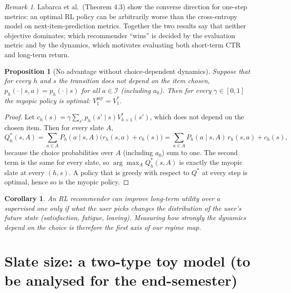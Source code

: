\documentclass[11pt]{article}
\newtheorem{proposition}{Proposition}
\newtheorem{corollary}{Corollary}
\theoremstyle{remark}
\newtheorem{remark}{Remark}
\newcommand{\I}{\mathcal{I}}
\begin{document}
\begin{remark}
Labarca et al.\ (Theorem 4.3) show the converse direction for one-step metrics: an optimal RL policy can be
arbitrarily worse than the cross-entropy model on next-item-prediction metrics. Together the two results say that
neither objective dominates; which recommender ``wins'' is decided by the evaluation metric and by the
dynamics, which motivates evaluating both short-term CTR and long-term return.
\end{remark}

\begin{proposition}[No advantage without choice-dependent dynamics]\label{prop:noadv}
Suppose that for every $h$ and $s$ the transition does not depend on the item chosen,
$p_h(\cdot \mid s, a) = p_h(\cdot \mid s)$ for all $a \in \I$ (including $a_0$). Then for every $\gamma \in [0,1]$
the myopic policy is optimal: $V^{\mathrm{my}}_1 = V^*_1$.
\end{proposition}
\begin{proof}
Let $c_h(s) = \gamma \sum_{s'} p_h(s' \mid s) V^*_{h+1}(s')$, which does not depend on the chosen item. Then for every
slate $A$,
\[
Q^*_h(s, A) = \sum_{a \in A} P_h(a \mid s, A) \bigl(r_h(s,a) + c_h(s)\bigr)
= \sum_{a \in A} P_h(a \mid s, A)\, r_h(s,a) + c_h(s),
\]
because the choice probabilities over $A$ (including $a_0$) sum to one. The second term is the same for every
slate, so $\arg\max_A Q^*_h(s, A)$ is exactly the myopic slate at every $(h, s)$. A policy that is greedy with
respect to $Q^*$ at every step is optimal, hence so is the myopic policy.
\end{proof}

\begin{corollary}
An RL recommender can improve long-term utility over a supervised one only if what the user picks changes the
distribution of the user's future state (satisfaction, fatigue, leaving). Measuring how strongly the
dynamics depend on the choice is therefore the first axis of our regime map.
\end{corollary}

\section{Slate size: a two-type toy model (to be analysed for the end-semester)}
\end{document}
